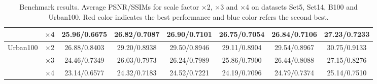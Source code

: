 \documentclass[10pt,twocolumn,letterpaper]{article}
\begin{document}
\begin{table}
\begin{center}
\begin{tabular}{ | c | c | c | c | c | c | c | c | }
 & $\times$4 & 25.96/0.6675 & 26.82/0.7087 & {\color{blue}26.90}/0.7101 & 26.75/0.7054 & 26.84/{\color{blue}0.7106} & {\color{red}27.23}/{\color{red}0.7233}\\
\hline
\hline
\multirow{3}{*}{Urban100} & $\times$2 & 26.88/0.8403 & 29.20/0.8938 & 29.50/0.8946 & 29.11/0.8904 & {\color{blue}29.54}/{\color{blue}0.8967} & {\color{red}30.75}/{\color{red}0.9133}\\
 & $\times$3 & 24.46/0.7349 & 26.03/0.7973 & 26.24/0.7989 & 25.86/0.7900 & {\color{blue}26.44}/{\color{blue}0.8088} & {\color{red}27.15}/{\color{red}0.8276}\\
 & $\times$4 & 23.14/0.6577 & 24.32/0.7183 & 24.52/0.7221 & 24.19/0.7096 & {\color{blue}24.79}/{\color{blue}0.7374} & {\color{red}25.14}/{\color{red}0.7510}\\
\hline
\end{tabular}
\caption{Benchmark results. Average PSNR/SSIMs for scale factor $\times$2, $\times$3 and $\times$4 on datasets Set5, Set14, B100 and Urban100. {\color{red}Red color} indicates the best performance and {\color{blue}blue color} refers the second best.}
\label{tbl:benchmark}
\end{center}
\end{table}
\end{document}
